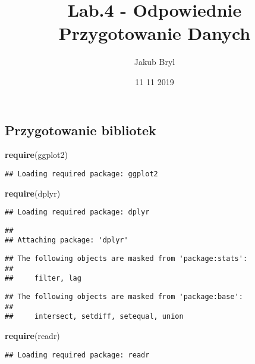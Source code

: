 \documentclass[]{article}
\title{Lab.4 - Odpowiednie Przygotowanie Danych}
\author{Jakub Bryl}
\date{11 11 2019}
\newenvironment{Shaded}{\begin{snugshade}}{\end{snugshade}}
\newcommand{\KeywordTok}[1]{\textcolor[rgb]{0.13,0.29,0.53}{\textbf{#1}}}
\newcommand{\NormalTok}[1]{#1}
\begin{document}
\maketitle

\hypertarget{przygotowanie-bibliotek}{%
\subsection{Przygotowanie bibliotek}\label{przygotowanie-bibliotek}}

\begin{Shaded}
\begin{Highlighting}[]
\KeywordTok{require}\NormalTok{(ggplot2)}
\end{Highlighting}
\end{Shaded}

\begin{verbatim}
## Loading required package: ggplot2
\end{verbatim}

\begin{Shaded}
\begin{Highlighting}[]
\KeywordTok{require}\NormalTok{(dplyr)}
\end{Highlighting}
\end{Shaded}

\begin{verbatim}
## Loading required package: dplyr
\end{verbatim}

\begin{verbatim}
## 
## Attaching package: 'dplyr'
\end{verbatim}

\begin{verbatim}
## The following objects are masked from 'package:stats':
## 
##     filter, lag
\end{verbatim}

\begin{verbatim}
## The following objects are masked from 'package:base':
## 
##     intersect, setdiff, setequal, union
\end{verbatim}

\begin{Shaded}
\begin{Highlighting}[]
\KeywordTok{require}\NormalTok{(readr)}
\end{Highlighting}
\end{Shaded}

\begin{verbatim}
## Loading required package: readr
\end{verbatim}
\end{document}
